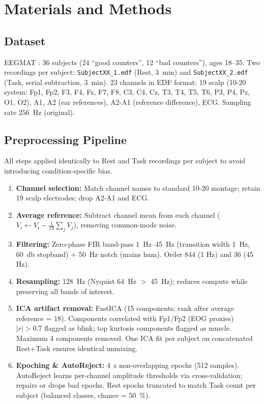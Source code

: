 \documentclass[conference]{IEEEtran}
\begin{document}
\section{Materials and Methods}

\subsection{Dataset}
\label{sec:dataset}
EEGMAT \cite{zyma2019electroencephalograms}: 36 subjects (24 ``good counters'', 12 ``bad counters''), ages \SIrange{18}{35}{\year}. Two recordings per subject: \texttt{SubjectXX\_1.edf} (Rest, \texttildelow\SI{3}{\minute}) and \texttt{SubjectXX\_2.edf} (Task, serial subtraction, \texttildelow\SI{3}{\minute}). \num{23} channels in EDF format: \num{19} scalp (10-20 system: Fp1, Fp2, F3, F4, Fz, F7, F8, C3, C4, Cz, T3, T4, T5, T6, P3, P4, Pz, O1, O2), A1, A2 (ear references), A2-A1 (reference difference), ECG. Sampling rate \SI{256}{\hertz} (original).

\subsection{Preprocessing Pipeline}
\label{sec:preprocess}
All steps applied identically to Rest and Task recordings per subject to avoid introducing condition-specific bias.

\begin{enumerate}
    \item \textbf{Channel selection:} Match channel names to standard 10-20 montage; retain \num{19} scalp electrodes; drop A2-A1 and ECG.
    \item \textbf{Average reference:} Subtract channel mean from each channel ($V_i \leftarrow V_i - \frac{1}{19}\sum_j V_j$), removing common-mode noise.
    \item \textbf{Filtering:} Zero-phase FIR band-pass \SIrange{1}{45}{\hertz} (transition width \SI{1}{\hertz}, \SI{60}{\decibel} stopband) + \SI{50}{\hertz} notch (mains hum). Order \num{844} (1 Hz) and \num{36} (45 Hz).
    \item \textbf{Resampling:} \SI{128}{\hertz} (Nyquist \SI{64}{\hertz} $>$ \SI{45}{\hertz}); reduces compute while preserving all bands of interest.
    \item \textbf{ICA artifact removal:} FastICA (\num{15} components; rank after average reference = \num{18}). Components correlated with Fp1/Fp2 (EOG proxies) $|r| > 0.7$ flagged as blink; top kurtosis components flagged as muscle. Maximum \num{4} components removed. One ICA fit per subject on concatenated Rest+Task ensures identical unmixing.
    \item \textbf{Epoching \& AutoReject:} \SI{4}{\second} non-overlapping epochs (\num{512} samples). AutoReject \cite{jas2017autoreject} learns per-channel amplitude thresholds via cross-validation; repairs or drops bad epochs. Rest epochs truncated to match Task count per subject (balanced classes, chance = \SI{50}{\%}).
\end{enumerate}
\end{document}
